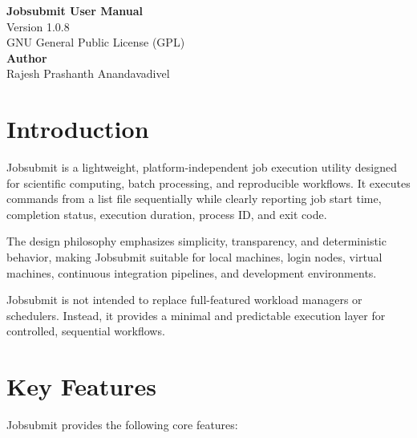 \documentclass[12pt,a4paper]{article}
\begin{document}
\begin{center}
    {\LARGE \textbf{Jobsubmit User Manual}} \\[0.4cm]
    {\large Version 1.0.8} \\[0.2cm]
    {\large GNU General Public License (GPL)} \\[1cm]
    \textbf{Author} \\[0.2cm]
    Rajesh Prashanth Anandavadivel
\end{center}

\vspace{1cm}
\onehalfspacing
\justifying

\section{Introduction}

Jobsubmit is a lightweight, platform-independent job execution utility designed for scientific computing, batch processing, and reproducible workflows. It executes commands from a list file sequentially while clearly reporting job start time, completion status, execution duration, process ID, and exit code.

The design philosophy emphasizes simplicity, transparency, and deterministic behavior, making Jobsubmit suitable for local machines, login nodes, virtual machines, continuous integration pipelines, and development environments.

Jobsubmit is not intended to replace full-featured workload managers or schedulers. Instead, it provides a minimal and predictable execution layer for controlled, sequential workflows.

\section{Key Features}

Jobsubmit provides the following core features:
\end{document}

